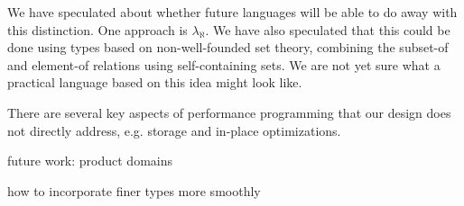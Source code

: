 We have speculated about whether future languages will be able to do away
with this distinction. One approach is $\lambda_{\aleph}$. We have also
speculated that this could be done using types based on non-well-founded
set theory, combining the subset-of and element-of relations using
self-containing sets. We are not yet sure what a practical language based
on this idea might look like.


There are several key aspects of performance programming that our design
does not directly address, e.g.  storage and in-place optimizations.

future work:
product domains

how to incorporate finer types more smoothly



